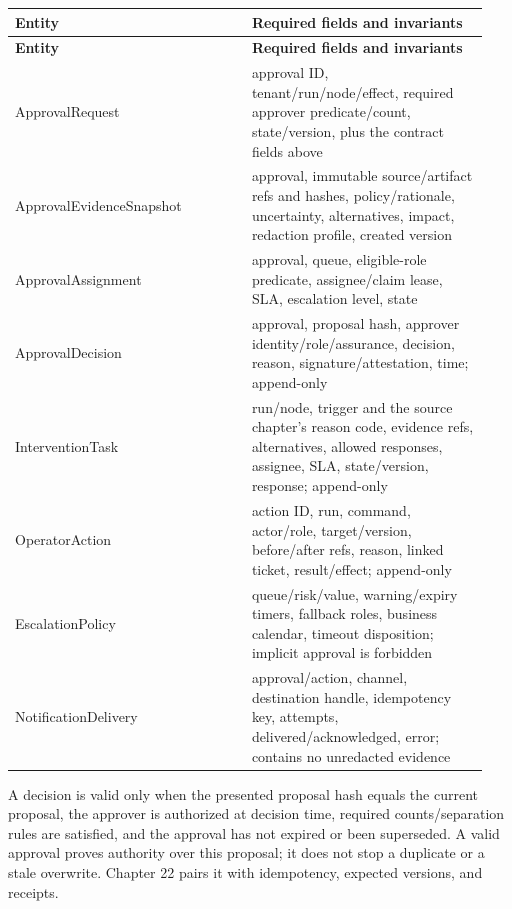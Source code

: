 \BookTableStart
\small
\begin{longtable}{@{}Y{0.4700\linewidth}Y{0.4700\linewidth}@{}}
\color{white}\bfseries \textbf{Entity} & \color{white}\bfseries \textbf{Required fields and invariants} \\
\endfirsthead
{}
\color{white}\bfseries \textbf{Entity} & \color{white}\bfseries \textbf{Required fields and invariants} \\
\endhead
ApprovalRequest & approval ID, tenant/run/node/effect, required approver predicate/count, state/version, plus the contract fields above \\
ApprovalEvidenceSnapshot & approval, immutable source/artifact refs and hashes, policy/rationale, uncertainty, alternatives, impact, redaction profile, created version \\
ApprovalAssignment & approval, queue, eligible-role predicate, assignee/claim lease, SLA, escalation level, state \\
ApprovalDecision & approval, proposal hash, approver identity/role/assurance, decision, reason, signature/attestation, time; append-only \\
InterventionTask & run/node, trigger and the source chapter's reason code, evidence refs, alternatives, allowed responses, assignee, SLA, state/version, response; append-only \\
OperatorAction & action ID, run, command, actor/role, target/version, before/after refs, reason, linked ticket, result/effect; append-only \\
EscalationPolicy & queue/risk/value, warning/expiry timers, fallback roles, business calendar, timeout disposition; implicit approval is forbidden \\
NotificationDelivery & approval/action, channel, destination handle, idempotency key, attempts, delivered/acknowledged, error; contains no unredacted evidence \\
\end{longtable}
\BookTableEnd

A decision is valid only when the presented proposal hash equals the current proposal, the approver is authorized at decision time, required counts/separation rules are satisfied, and the approval has not expired or been superseded. A valid approval proves authority over this proposal; it does not stop a duplicate or a stale overwrite. Chapter 22 pairs it with idempotency, expected versions, and receipts.\par

